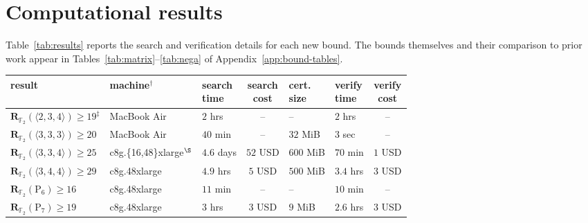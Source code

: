 \documentclass[11pt]{article}
\theoremstyle{definition}
\newcommand{\F}{\mathbb{F}}
\newcommand{\Rk}[2]{\mathbf{R}_{#1}(#2)}
\newcommand{\Fullt}[1]{\mathrm{P}_{#1}}
\newcommand{\mmt}[3]{\langle #1,#2,#3\rangle}
\begin{document}
\section{Computational results}\label{app:results}

Table~\ref{tab:results} reports the search and verification details for each new bound.
The bounds themselves and their comparison to prior work appear in
Tables~\ref{tab:matrix}--\ref{tab:nega} of Appendix~\ref{app:bound-tables}.

\begin{table}[!ht]
  \centering
  \setlength{\tabcolsep}{4pt}
  \begin{tabular}{lllcllc}
    \toprule
    result                                    & machine$^\dagger$        & \shortstack{search\\time} & \shortstack{search\\cost} & \shortstack{cert.\\size} & \shortstack{verify\\time} & \shortstack{verify\\cost} \\
    \midrule
    $\Rk{\F_2}{\mmt{2}{3}{4}}\ge 19^\ddagger$ & MacBook Air              & $2$ hrs                   & --                        & --                       & $2$ hrs                   & --                        \\
    $\Rk{\F_2}{\mmt{3}{3}{3}}\ge 20$          & MacBook Air              & $40$ min                  & --                        & $32$ MiB                 & $3$ sec                   & --                        \\
    $\Rk{\F_2}{\mmt{3}{3}{4}}\ge 25$          & c8g.\{16,48\}xlarge$^\S$ & $4.6$ days                & $52$ USD                  & $600$ MiB                & $70$ min                  & $1$ USD                   \\
    $\Rk{\F_2}{\mmt{3}{4}{4}}\ge 29$          & c8g.48xlarge             & $4.9$ hrs                 & $5$ USD                   & $500$ MiB                & $3.4$ hrs                 & $3$ USD                   \\
    \midrule
    $\Rk{\F_2}{\Fullt{6}}\ge 16$              & c8g.48xlarge             & $11$ min                  & --                        & --                       & $10$ min                  & --                        \\
    $\Rk{\F_2}{\Fullt{7}}\ge 19$              & c8g.48xlarge             & $3$ hrs                   & $3$ USD                   & $9$ MiB                  & $2.6$ hrs                 & $3$ USD                   \\

\end{tabular}
\end{table}
\end{document}
